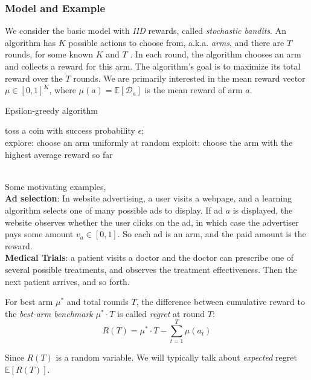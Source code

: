 \subsubsection{Model and Example}
We consider the basic model with \textit{IID} rewards, called \textit{stochastic bandits}\cite{mab-intro}. 
An algorithm has $K$ possible actions to choose from, a.k.a. \textit{arms}, and there are $T$ rounds, for some known $K$ and $T$ . 
In each round, the algorithm chooses an arm and collects a reward for this arm. The algorithm’s goal is to maximize its total reward over the $T$ rounds. We are primarily interested in the mean reward vector $\mu \in [0, 1]^K$, where $\mu(a) = \mathbb{E}[\mathcal{D}_a]$ is the mean reward of arm $a$.
\begin{algorithm}
	\caption{Epsilon-greedy algorithm}
	{
		toss a coin with success probability $\epsilon$;\\
		{
			explore: choose an arm uniformly at random
		}
		{
			exploit: choose the arm with the highest average reward so far
		}
	}
\end{algorithm}\\
Some motivating examples,\\
\textbf{Ad selection}: In website advertising, a user visits a webpage, and a learning algorithm selects one of many possible ads to display. If ad $a$ is displayed, the website observes whether the user clicks on the ad, in which case the advertiser pays some amount $v_a \in [0, 1]$. So each ad is an arm, and the paid amount is the reward.\\
\textbf{Medical Trials}: a patient visits a doctor and the doctor can prescribe one of several possible treatments, and observes the treatment effectiveness. Then the next patient arrives, and so forth.
\begin{definition}
	For best arm $\mu^*$ and total rounds $T$, the difference between cumulative reward to the \textit{best-arm benchmark} $\mu^* \cdot T$ is called \textit{regret} at round $T$:
	$$ R(T) = \mu^* \cdot T - \sum_{t=1}^{T}\mu(a_t) $$
\end{definition}
Since $R(T)$ is a random variable. We will typically talk about \textit{expected} regret $\mathbb{E}[R(T)]$.

